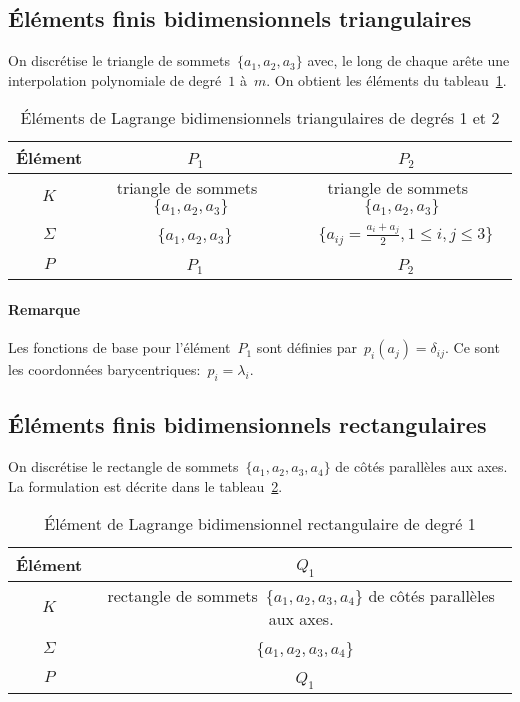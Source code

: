 \medskip
\subsection*{Éléments finis bidimensionnels triangulaires}
On discrétise le triangle de sommets~$\{a_1, a_2, a_3\}$ avec, le long de chaque
arête une interpolation polynomiale de degré~$1$ à~$m$.
On obtient les éléments du tableau~\ref{tab:Elem:bi}.
\begin{table}[ht]\centering\small
\begin{tabular}{c|cc}
Élément &~$P_1$ &~$P_2$ \\
\hline
$K$	  & triangle de sommets~$\{a_1, a_2, a_3\}$ & triangle de sommets~$\{a_1, a_2, a_3\}$\\
$\Sigma$ &~$\{a_1, a_2, a_3\}$ &~$\{a_{ij}=\frac{a_i+a_j}2, 1\le i,j\le 3\}$ \\
$P$   &~$P_1$ &~$P_2$ \\
\hline
\end{tabular}
\caption{Éléments de Lagrange bidimensionnels triangulaires de degrés 1 et 2}\label{tab:Elem:bi}
\end{table}

\paragraph{Remarque}Les fonctions de base pour l'élément~$P_1$ sont définies par~$p_i(a_j) = \delta_{ij}$. Ce sont les coordonnées barycentriques:~$p_i = \lambda_i$.

\medskip
\subsection*{Éléments finis bidimensionnels rectangulaires}
On discrétise le rectangle de sommets~$\{a_1, a_2, a_3, a_4\}$ de côtés
parallèles aux axes. La formulation est décrite dans le tableau~\ref{tab:Elem:bibi}.
\begin{table}[ht]\centering\small
\begin{tabular}{c|c}
Élément &~$Q_1$\\
\hline
$K$ & rectangle de sommets~$\{a_1, a_2, a_3, a_4\}$ de côtés parallèles aux axes.\\
$\Sigma$ &~$\{a_1, a_2, a_3, a_4\}$\\
$P$ &~$Q_1$\\
\hline
\end{tabular}
\caption{Élément de Lagrange bidimensionnel rectangulaire de degré 1}\label{tab:Elem:bibi}
\end{table}


